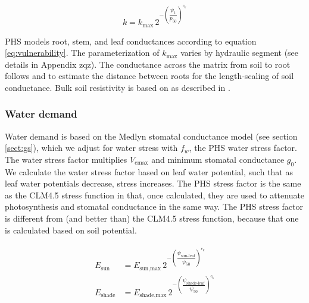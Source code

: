 \documentclass[draft,linenumbers]{agujournal}
\begin{document}
     \begin{linenomath*}
     \begin{equation}
     \label{eq:vulnerability}
     k = k_{\text{max}} \, 2^{-\left(\dfrac{\psi_1}{p_{50}}\right)^{c_k}}
     \end{equation}
     \end{linenomath*}
     
     PHS models root, stem, and leaf conductances according to equation \ref{eq:vulnerability}.
     The parameterization of $k_{\text{max}}$ varies by hydraulic segment (see details in Appendix zqz).
     The conductance across the matrix from soil to root follows \citet{williams2001} and \citet{bonan2014} 
     to estimate the distance between roots for the length-scaling of soil conductance. 
     Bulk soil resistivity is based on \citet{clapp1978} as described in \citet{oleson2013}.
    
    \subsubsection{Water demand}
    
    Water demand is based on the Medlyn stomatal conductance model (see section \ref{sect:gs}), 
    which we adjust for water stress with $f_w$, the PHS water stress factor. 
    The water stress factor multiplies $V_{\text{cmax}}$ and minimum stomatal conductance $g_0$.
    We calculate the water stress factor based on leaf water potential, such that 
    as leaf water potentials decrease, stress increases.
    The PHS stress factor is the same as the CLM4.5 stress function in that, once calculated, they are used
    to attenuate photosynthesis and stomatal conductance in the same way.
    The PHS stress factor is different from (and better than) the CLM4.5 stress function, because that one 
    is calculated based on soil potential.
    
     \begin{linenomath*}
     \begin{eqnarray}
     \begin{aligned}
     \label{eq:demand}
     E_{\text{sun}}     &= E_{\text{sun,max}} \, 2^{-\left(\dfrac{\psi_{\text{sun-leaf}}}{\psi_{50}}\right)^{c_k}} \\
     E_{\text{shade}} &= E_{\text{shade,max}} \, 2^{-\left(\dfrac{\psi_{\text{shade-leaf}}}{\psi_{50}}\right)^{c_k}}
     \end{aligned}
     \end{eqnarray}
     \end{linenomath*}
    
\end{document}
